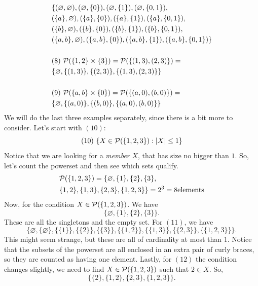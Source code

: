 \begin{solution}
$$\begin{aligned}
        & \{ (\varnothing,\varnothing), (\varnothing, \{ 0 \}),(\varnothing, \{ 1 \}),(\varnothing, \{ 0,1 \}),\\
        &(\{ a \},\varnothing),(\{ a \},\{ 0 \}),(\{ a \},\{ 1 \}),(\{ a \},\{ 0,1 \}),\\
        &(\{ b \},\varnothing),(\{ b \},\{ 0 \}),(\{ b \},\{ 1 \}), (\{ b \},\{ 0,1 \}),\\
        &(\{ a,b \},\varnothing),(\{ a,b \},\{ 0 \}),(\{ a,b \},\{ 1 \}),(\{ a,b \},\{ 0,1 \}) \}\\\\
        &(8)~\mathcal{P}(\{ 1,2 \}\times \{ 3 \})= \mathcal{P}(\{ (1,3),(2,3) \})=\\
        & \{ \varnothing, \{ (1,3) \},\{ (2,3) \},\{ (1,3),(2,3) \} \}\\\\
        &(9)~\mathcal{P}(\{ a,b \}\times \{ 0 \})=\mathcal{P}(\{ (a,0),(b,0) \})=\\
        &\{ \varnothing,\{ (a,0) \},\{ (b,0) \},\{ (a,0),(b,0) \} \}
    \end{aligned}
    $$
    We will do the last three examples separately, since there is a bit more to consider. Let's start with $(10)$:
    $$
    (10)~\{ X\in\mathcal{P}(\{ 1,2,3 \}): \lvert X \rvert\le 1 \}
    $$
    Notice that we are looking for a \emph{member} $X$, that has size no bigger than $1$. So, let's count the powerset and then see which sets qualify. 
    $$
    \begin{aligned}
        &\mathcal{P}(\{ 1,2,3 \})= \{ \varnothing, \{ 1 \},\{ 2 \},\{ 3 \},\\
        &\{ 1,2 \},\{ 1,3 \},\{ 2,3 \},\{ 1,2,3 \} \}=2^3=8 \text{elements}
    \end{aligned}
    $$
    Now, for the condition $X\in\mathcal{P}(\{ 1,2,3 \})$. We have 
    $$
    \{\varnothing, \{ 1 \},\{ 2 \},\{ 3 \}\}.
    $$
These are all the singletons and the empty set. For $(11)$, we have 
$$
\{ \varnothing,\{ \varnothing \}, \{ \{ 1 \} \},\{ \{ 2 \} \},\{ \{ 3 \} \}, \{ \{ 1,2 \} \},\{ \{ 1,3 \} \},\{ \{ 2,3 \} \},\{ \{ 1,2,3 \} \} \}.
$$
This might seem strange, but these are all of cardinality at most than $1$. Notice that the subsets of the powerset are all enclosed in an extra pair of curly braces, so they are counted as having one element. Lastly, for $(12)$ the condition changes slightly, we need to find $X\in\mathcal{P}(\{ 1,2,3 \})$ such that $2\in X$. So, 
$$
\{\{ 2 \},\{ 1,2 \},\{ 2,3 \},\{ 1,2,3 \}\}.
$$    
\end{solution}

